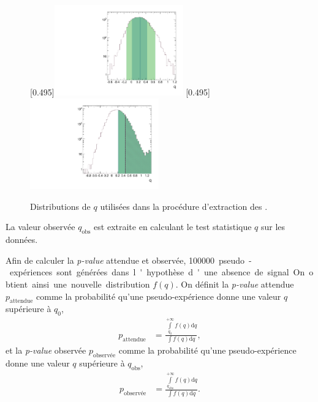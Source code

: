 \begin{figure}[tbp] \centering
    [0.495\textwidth]{\includegraphics[width=0.495\textwidth,angle=-90,origin=c]{chapitre8/figs/stats/dnll_expected.pdf}} \hfill
    [0.495\textwidth]{\includegraphics[width=0.495\textwidth,angle=-90,origin=c]{chapitre8/figs/stats/dnll_toy.pdf}}
    \caption{Distributions de $q$ utilisées dans la procédure d'extraction des \pvalues.}
    \label{fig:label}
\end{figure}

La valeur observée $q_\text{obs}$ est extraite en calculant le test statistique $q$ sur les données.

\medskip

Afin de calculer la \emph{p-value} attendue et observée, \SI{100 000} pseudo-expériences sont générées dans l'hypothèse d'une absence de signal. On obtient ainsi une nouvelle distribution $f(q)$. On définit la \emph{p-value} attendue $p_\text{attendue}$ comme la probabilité qu'une pseudo-expérience donne une valeur $q$ supérieure à $q_0$,
\begin{align*}
  p_\text{attendue} &= \frac{ \int \limits_{q_0}^{+ \infty} f(q) \mathrm{d}q }{ \int f(q) \mathrm{d}q },
\end{align*}
et la \emph{p-value} observée $p_\text{observée}$ comme la probabilité qu'une pseudo-expérience donne une valeur $q$ supérieure à $q_\text{obs}$,
\begin{align*}
  p_\text{observée} &= \frac{ \int \limits_{q_\text{obs}}^{+ \infty} f(q) \mathrm{d}q }{ \int f(q) \mathrm{d}q }.
\end{align*}

